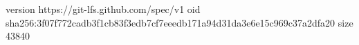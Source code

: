 version https://git-lfs.github.com/spec/v1
oid sha256:3f07f772cadb3f1cb83f3edb7cf7eeedb171a94d31da3e6e15c969c37a2dfa20
size 43840
